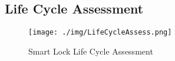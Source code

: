 \subsection{Life Cycle Assessment}

\begin{figure}
    \centering
    \texttt{[image: ./img/LifeCycleAssess.png]}
    \caption{Smart Lock Life Cycle Assessment}
    \label{fig:enter-label}
\end{figure}
